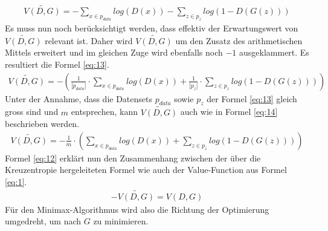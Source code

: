 \begin{align}
    \widetilde{V(D,G)} = - \sum_{x \in p_{data}} log(D(x)) - \sum_{z \in p_{z}} log(1 - D(G(z)))
\end{align}
Es muss nun noch berücksichtigt werden, dass effektiv der Erwartungswert von $\widetilde{V(D,G)}$ relevant ist. Daher
wird $\widetilde{V(D,G)}$ um den Zusatz des arithmetischen Mittels erweitert und im gleichen Zuge wird ebenfalls noch
$-1$ ausgeklammert. Es resultiert die Formel \ref{eq:13}.
\begin{align}
    \widetilde{V(D,G)} = - (\frac{1}{|p_{data}|} \cdot \sum_{x \in p_{data}} log(D(x)) + \frac{1}{|p_{z}|} \cdot \sum_{z \in p_{z}} log(1 - D(G(z))))\label{eq:13}
\end{align}
Unter der Annahme, dass die Datensets $p_{data}$ sowie $p_{z}$ der Formel \ref{eq:13} gleich gross sind und $m$ entsprechen, kann $\widetilde{V(D,G)}$
auch wie in Formel \ref{eq:14} beschrieben werden.
\begin{align}
    \widetilde{V(D,G)} = - \frac{1}{m} \cdot (\sum_{x \in p_{data}} log(D(x)) + \sum_{z \in p_{z}} log(1 - D(G(z))))\label{eq:14}
\end{align}
Formel \ref{eq:12} erklärt nun den Zusammenhang zwischen der über die Kreuzentropie hergeleiteten Formel wie auch der Value-Function aus Formel \ref{eq:1}.
\begin{align}
    -\widetilde{V(D,G)} = V(D,G)\label{eq:12}
\end{align}
Für den Minimax-Algorithmus wird also die Richtung der Optimierung umgedreht, um nach $G$ zu minimieren.

\newpage

